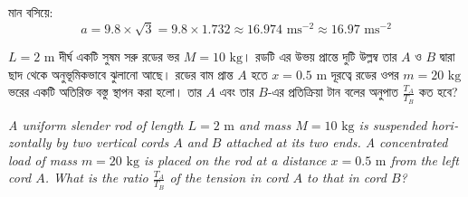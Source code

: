 \documentclass[12pt, a4paper]{article}
\begin{document}
{\begin{tcolorbox}[solutionbox={সমাধান (Solution)}]
মান বসিয়ে:
\[ a = 9.8 \times \sqrt{3} = 9.8 \times 1.732 \approx 16.974\text{ ms}^{-2} \approx 16.97\text{ ms}^{-2} \]
\end{tcolorbox}


\begin{tcolorbox}[questionbox={প্রশ্ন (Question) 17}]
\noindent
$L = 2\text{ m}$ দীর্ঘ একটি সুষম সরু রডের ভর $M = 10\text{ kg}$। রডটি এর উভয় প্রান্তে দুটি উল্লম্ব তার $A$ ও $B$ দ্বারা ছাদ থেকে অনুভূমিকভাবে ঝুলানো আছে। রডের বাম প্রান্ত $A$ হতে $x = 0.5\text{ m}$ দূরত্বে রডের ওপর $m = 20\text{ kg}$ ভরের একটি অতিরিক্ত বস্তু স্থাপন করা হলো। তার $A$ এবং তার $B$-এর প্রতিক্রিয়া টান বলের অনুপাত $\frac{T_A}{T_B}$ কত হবে?

\vspace{0.8em}
\begin{english}
\noindent\textit{\color{darkgray}
A uniform slender rod of length $L = 2\text{ m}$ and mass $M = 10\text{ kg}$ is suspended horizontally by two vertical cords $A$ and $B$ attached at its two ends. A concentrated load of mass $m = 20\text{ kg}$ is placed on the rod at a distance $x = 0.5\text{ m}$ from the left cord $A$. What is the ratio $\frac{T_A}{T_B}$ of the tension in cord $A$ to that in cord $B$?
}
\end{english}
\end{tcolorbox}

\vspace{1em}
\begin{center}
\end{center}
\vspace{1em}

}
\end{document}
